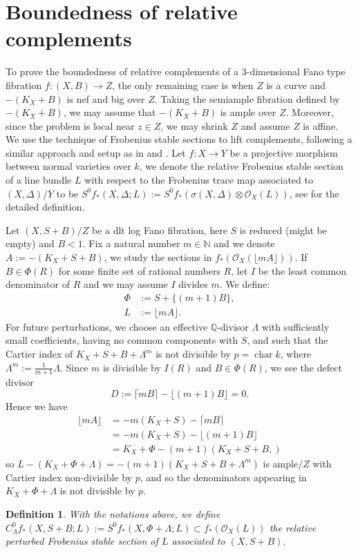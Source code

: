 \documentclass[letterpaper,reqno,12pt]{amsart}
\DeclareMathOperator{\chara}{char}
\numberwithin{equation}{section}
\theoremstyle{plain}
\newtheorem{definition}{Definition}[section]
\begin{document}
\section{Boundedness of relative complements}









To prove the boundedness of relative complements of a 3-dimensional Fano type fibration $f:(X,B)\to Z$, the only remaining case is when $Z$ is a curve and $-(K_X+B)$ is nef and big over $Z$. Taking the semiample fibration defined by $-(K_X+B)$, we may assume that $-(K_X+B)$ is ample over $Z$. Moreover, since the problem is local near $z\in Z$, we may shrink $Z$ and assume $Z$ is affine. We use the technique of Frobenius stable sections to lift complements, following a similar approach and setup as in \cite{threedimmmp} and \cite{HW19}. Let $f:X\to Y$ be a projective morphism between normal varieties over $k$, we denote the relative Frobenius stable section of a line bundle $L$ with respect to the Frobenius trace map associated to $(X,\Delta)/Y$ to be $S^0f_*(X,\Delta;L):=S^0f_*(\sigma(X,\Delta)\otimes \mathcal O_X(L))$, see \cite{threedimmmp} for the detailed definition.

Let $(X,S+B)/Z$ be a dlt log Fano fibration, here $S$ is reduced (might be empty) and $B<1$. Fix a natural number $m\in\mathbb N$ and we denote $A:=-(K_X+S+B)$, we study the sections in $f_*(\mathcal O_X(\lfloor mA\rfloor))$. If $B\in \Phi(R)$ for some finite set of rational numbers $R$, let $I$ be the least common denominator of $R$ and we may assume $I$ divides $m$. We define:
\[\begin{aligned}
    \Phi&:=S+\{(m+1)B\},\\
    L&:=\lfloor mA\rfloor.
\end{aligned}\]
For future perturbations, we choose an effective $\mathbb Q$-divisor $\Lambda$ with sufficiently small coefficients, having no common components with $S$, and such that the Cartier index of $K_X+S+B+\Lambda^m$ is not divisible by $p=\chara k$, where $\Lambda^m:=\frac{1}{m+1}\Lambda$. Since $m$ is divisible by $I(R)$ and $B\in\Phi(R)$, we see the defect divisor \[D:=\lceil mB\rceil-\lfloor (m+1)B\rfloor=0.\]
Hence we have 
\[\begin{aligned}
    \lfloor mA\rfloor&=-m(K_X+S)-\lceil mB\rceil\\
    &=-m(K_X+S)-\lfloor(m+1)B\rfloor\\
    &=K_X+\Phi-(m+1)(K_X+S+B,)
\end{aligned}\]
so $L-(K_X+\Phi+\Lambda)=-(m+1)(K_X+S+B+\Lambda^m)$ is ample$/Z$ with Cartier index non-divisible by $p$, and so the denominators appearing in $K_X+\Phi+\Lambda$ is not divisible by $p$.
\begin{definition}
    With the notations above, we define $C^0_\Lambda f_*(X,S+B;L):=S^0f_*(X,\Phi+\Lambda; L)\subset f_*(\mathcal O_X(L))$ the relative perturbed Frobenius stable section of $L$ associated to $(X,S+B)$.
\end{definition}
\end{document}

